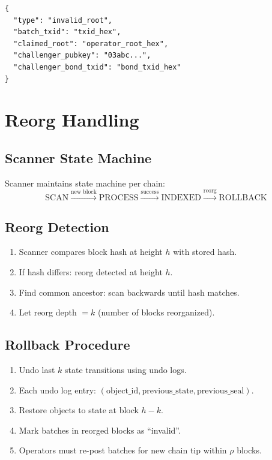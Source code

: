 \documentclass[a4paper,11pt]{article}
\begin{document}
\begin{lstlisting}[style=script]
{
  "type": "invalid_root",
  "batch_txid": "txid_hex",
  "claimed_root": "operator_root_hex",
  "challenger_pubkey": "03abc...",
  "challenger_bond_txid": "bond_txid_hex"
}
\end{lstlisting}

\section{Reorg Handling}

\subsection{Scanner State Machine}

Scanner maintains state machine per chain:
\[
    \text{SCAN} \xrightarrow{\text{new block}} \text{PROCESS} \xrightarrow{\text{success}} \text{INDEXED} \xrightarrow{\text{reorg}} \text{ROLLBACK}
\]

\subsection{Reorg Detection}

\begin{enumerate}[nosep]
    \item Scanner compares block hash at height $h$ with stored hash.
    \item If hash differs: reorg detected at height $h$.
    \item Find common ancestor: scan backwards until hash matches.
    \item Let reorg depth $= k$ (number of blocks reorganized).
\end{enumerate}

\subsection{Rollback Procedure}

\begin{enumerate}[nosep]
    \item Undo last $k$ state transitions using undo logs.
    \item Each undo log entry: $(\text{object\_id}, \text{previous\_state}, \text{previous\_seal})$.
    \item Restore objects to state at block $h - k$.
    \item Mark batches in reorged blocks as ``invalid''.
    \item Operators must re-post batches for new chain tip within $\rho$ blocks.
\end{enumerate}
\end{document}

